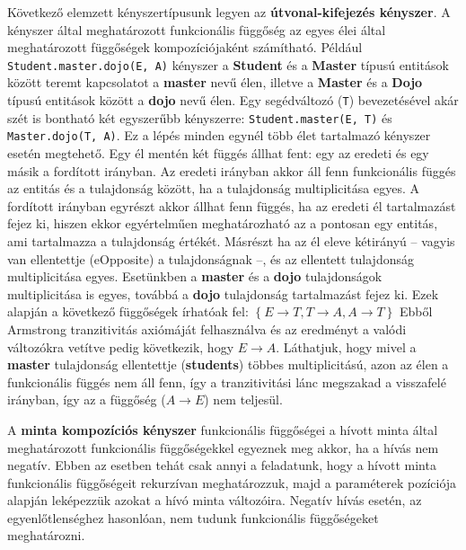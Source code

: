 \begin{sloppypar}
Következő elemzett kényszertípusunk legyen az \textbf{útvonal-kifejezés kényszer}.
A kényszer által meghatározott funkcionális függőség az egyes élei által meghatározott függőségek kompozíciójaként számítható.
Például \texttt{Student.master.dojo(E, A)} kényszer a \textbf{Student} és a \textbf{Master} típusú entitások között teremt kapcsolatot a \textbf{master} nevű élen, illetve a \textbf{Master} és a \textbf{Dojo} típusú entitások között a \textbf{dojo} nevű élen.
Egy segédváltozó (\texttt{T}) bevezetésével akár szét is bontható két egyszerűbb kényszerre: \texttt{Student.master(E, T)} és \texttt{Master.dojo(T, A)}.
Ez a lépés minden egynél több élet tartalmazó kényszer esetén megtehető.
Egy él mentén két függés állhat fent: egy az eredeti és egy másik a fordított irányban.
Az eredeti irányban akkor áll fenn funkcionális függés az entitás és a tulajdonság között, ha a tulajdonság multiplicitása egyes.
A fordított irányban egyrészt akkor állhat fenn függés, ha az eredeti él tartalmazást fejez ki, hiszen ekkor egyértelműen meghatározható az a pontosan egy entitás, ami tartalmazza a tulajdonság értékét.
Másrészt ha az él eleve kétirányú -- vagyis van ellentettje (eOpposite) a tulajdonságnak --, és az ellentett tulajdonság multiplicitása egyes.
Esetünkben a \textbf{master} és a \textbf{dojo} tulajdonságok multiplicitása is egyes, továbbá a \textbf{dojo} tulajdonság tartalmazást fejez ki.
Ezek alapján a következő függőségek írhatóak fel: $\left\{ E \rightarrow T, T \rightarrow A, A \rightarrow T \right\}$
Ebből Armstrong tranzitivitás axiómáját felhasználva és az eredményt a valódi változókra vetítve pedig következik, hogy $E \rightarrow A$.
Láthatjuk, hogy mivel a \textbf{master} tulajdonság ellentettje (\textbf{students}) többes multiplicitású, azon az élen a funkcionális függés nem áll fenn, így a tranzitivitási lánc megszakad a visszafelé irányban, így az a függőség ($A \rightarrow E$) nem teljesül.
\end{sloppypar}

A \textbf{minta kompozíciós kényszer} funkcionális függőségei a hívott minta által meghatározott funkcionális függőségekkel egyeznek meg akkor, ha a hívás nem negatív.
Ebben az esetben tehát csak annyi a feladatunk, hogy a hívott minta funkcionális függőségeit rekurzívan meghatározzuk, majd a paraméterek pozíciója alapján leképezzük azokat a hívó minta változóira.
Negatív hívás esetén, az egyenlőtlenséghez hasonlóan, nem tudunk funkcionális függőségeket meghatározni.


